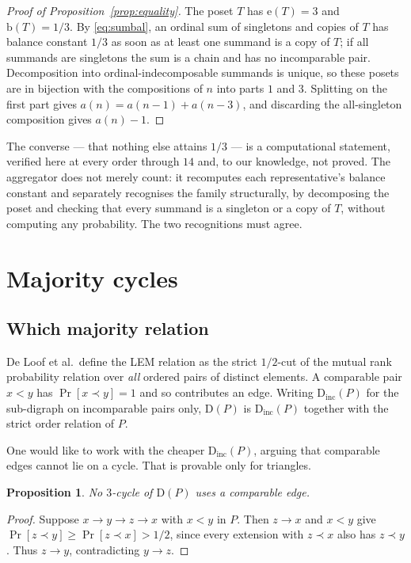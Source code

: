 \documentclass[11pt]{article}
\newtheorem{proposition}[theorem]{Proposition}
\theoremstyle{definition}
\newcommand{\ext}{\mathrm{e}}
\newcommand{\bal}{\mathrm{b}}
\newcommand{\Dig}{\mathrm{D}}
\begin{document}
\begin{proof}[Proof of Proposition~\ref{prop:equality}]
The poset $T$ has $\ext(T)=3$ and $\bal(T)=1/3$.  By \eqref{eq:sumbal}, an
ordinal sum of singletons and copies of $T$ has balance constant $1/3$ as soon
as at least one summand is a copy of $T$; if all summands are singletons the
sum is a chain and has no incomparable pair.  Decomposition into
ordinal-indecomposable summands is unique, so these posets are in bijection
with the compositions of $n$ into parts $1$ and $3$.  Splitting on the first
part gives $a(n)=a(n-1)+a(n-3)$, and discarding the all-singleton composition
gives $a(n)-1$.
\end{proof}

The converse --- that nothing else attains $1/3$ --- is a computational
statement, verified here at every order through $14$ and, to our knowledge,
not proved.  The aggregator does not merely count: it recomputes each
representative's balance constant and separately recognises the family
structurally, by decomposing the poset and checking that every summand is a
singleton or a copy of $T$, without computing any probability.  The two
recognitions must agree.

\section{Majority cycles}\label{sec:cycles}

\subsection{Which majority relation}

De Loof et al.\ define the LEM relation as the strict $1/2$-cut of the mutual
rank probability relation over \emph{all} ordered pairs of distinct elements.
A comparable pair $x<y$ has $\Pr[x\prec y]=1$ and so contributes an edge.
Writing $\Dig_{\mathrm{inc}}(P)$ for the sub-digraph on incomparable pairs
only, $\Dig(P)$ is $\Dig_{\mathrm{inc}}(P)$ together with the strict order
relation of $P$.

One would like to work with the cheaper $\Dig_{\mathrm{inc}}(P)$, arguing that
comparable edges cannot lie on a cycle.  That is provable only for triangles.

\begin{proposition}\label{prop:three}
No $3$-cycle of $\Dig(P)$ uses a comparable edge.
\end{proposition}

\begin{proof}
Suppose $x\to y\to z\to x$ with $x<y$ in $P$.  Then $z\to x$ and $x<y$ give
$\Pr[z\prec y]\geq\Pr[z\prec x]>1/2$, since every extension with $z\prec x$
also has $z\prec y$.  Thus $z\to y$, contradicting $y\to z$.
\end{proof}
\end{document}
